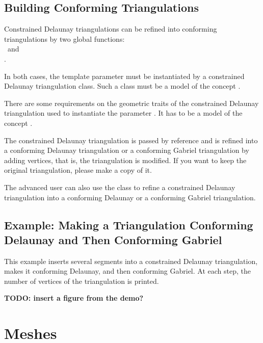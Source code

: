 \subsection{Building Conforming Triangulations}
\label{sec:Mesh_2_building_conforming}

Constrained Delaunay triangulations can be refined into
conforming triangulations 
by two global functions: \\
~and\\
. 

In both cases, the template parameter  must be instantiated
by a constrained Delaunay triangulation class.  Such a class must be a
model of the concept .

There are some requirements on the geometric traits of the constrained
Delaunay triangulation used to instantiate the parameter .
It has to be a model of the concept
.

The constrained Delaunay triangulation  is passed by reference
and is refined into a conforming Delaunay triangulation or a
conforming Gabriel triangulation by adding vertices, that is, the
triangulation is modified. If you want to keep the original
triangulation, please make a copy of it.

The advanced user can also use the class
 to refine a
constrained Delaunay triangulation into a conforming Delaunay or a
conforming Gabriel triangulation.

\subsection{Example: Making a Triangulation Conforming Delaunay and Then
  Conforming Gabriel}
\label{sec:Mesh_2_example_making_conforming}

This example inserts several segments into a constrained Delaunay
triangulation, makes it conforming Delaunay, and then conforming
Gabriel. At each step, the number of vertices of the triangulation is
printed.


\textbf{TODO: insert a figure from the demo?}

\section{Meshes}
\label{sec:Mesh_2_meshes}


